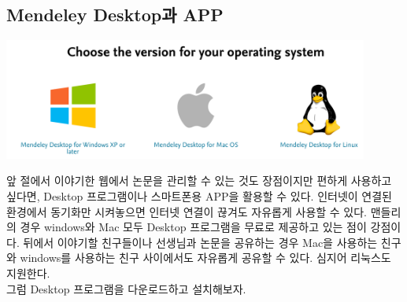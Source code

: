 \documentclass[11pt]{article}
\begin{document}
\newpage
\subsection{Mendeley Desktop과 APP}
\begin{center}
	\includegraphics[width=12cm]{./image/desktop7.png}
\end{center}
앞 절에서 이야기한 웹에서 논문을 관리할 수 있는 것도 장점이지만 편하게 사용하고 싶다면, Desktop 프로그램이나 스마트폰용 APP을 활용할 수 있다. 인터넷이 연결된 환경에서 동기화만 시켜놓으면 인터넷 연결이 끊겨도 자유롭게 사용할 수 있다. 맨들리의 경우 windows와 Mac 모두 Desktop 프로그램을 무료로 제공하고 있는 점이 강점이다. 뒤에서 이야기할 친구들이나 선생님과 논문을 공유하는 경우 Mac을 사용하는 친구와 windows를 사용하는 친구 사이에서도 자유롭게 공유할 수 있다. 심지어 리눅스도 지원한다. \\
그럼 Desktop 프로그램을 다운로드하고 설치해보자.\\
\end{document}
